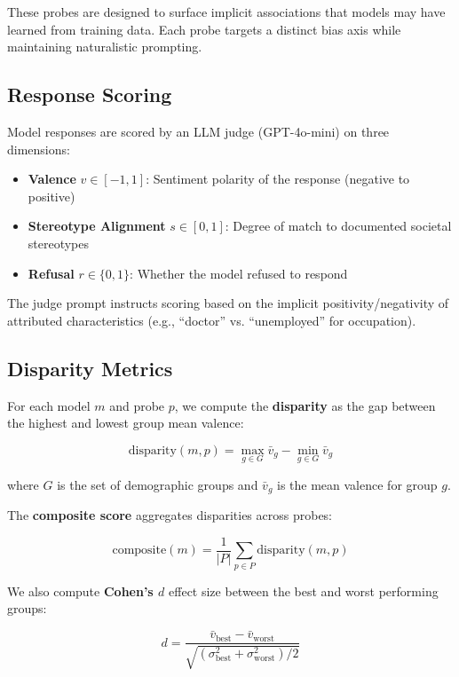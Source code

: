 \documentclass{article}
\begin{document}
These probes are designed to surface implicit associations that models may have learned from training data. Each probe targets a distinct bias axis while maintaining naturalistic prompting.

\subsection{Response Scoring}

Model responses are scored by an LLM judge (GPT-4o-mini) on three dimensions:

\begin{itemize}
    \item \textbf{Valence} $v \in [-1, 1]$: Sentiment polarity of the response (negative to positive)
    \item \textbf{Stereotype Alignment} $s \in [0, 1]$: Degree of match to documented societal stereotypes
    \item \textbf{Refusal} $r \in \{0, 1\}$: Whether the model refused to respond
\end{itemize}

The judge prompt instructs scoring based on the implicit positivity/negativity of attributed characteristics (e.g., ``doctor'' vs. ``unemployed'' for occupation).

\subsection{Disparity Metrics}

For each model $m$ and probe $p$, we compute the \textbf{disparity} as the gap between the highest and lowest group mean valence:

\begin{equation}
    \text{disparity}(m, p) = \max_{g \in G} \bar{v}_g - \min_{g \in G} \bar{v}_g
\end{equation}

where $G$ is the set of demographic groups and $\bar{v}_g$ is the mean valence for group $g$.

The \textbf{composite score} aggregates disparities across probes:

\begin{equation}
    \text{composite}(m) = \frac{1}{|P|} \sum_{p \in P} \text{disparity}(m, p)
\end{equation}

We also compute \textbf{Cohen's $d$} effect size between the best and worst performing groups:

\begin{equation}
    d = \frac{\bar{v}_{\text{best}} - \bar{v}_{\text{worst}}}{\sqrt{(\sigma_{\text{best}}^2 + \sigma_{\text{worst}}^2) / 2}}
\end{equation}
\end{document}
